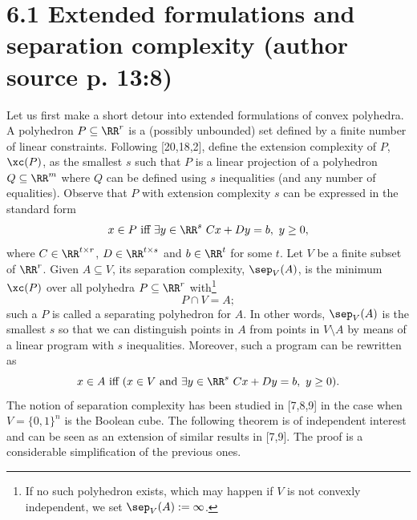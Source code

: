 \section*{6.1 Extended formulations and separation complexity (author source p. 13:8)}
Let us first make a short detour into extended formulations of convex polyhedra.
A polyhedron $P\subseteq\RR^r$ is a (possibly unbounded) set defined by a finite number of linear constraints. Following [20,18,2], define the extension complexity of $P$, $\xc(P)$, as the smallest $s$ such that $P$ is a linear projection of a polyhedron $Q\subseteq\RR^m$ where $Q$ can be defined using $s$ inequalities (and any number of equalities). Observe that $P$ with extension complexity $s$ can be expressed in the standard form
\[x\in P\text{ iff }\exists y\in\RR^s\ Cx+Dy=b,\ y\ge0,\]
where $C\in\RR^{t\times r}$, $D\in\RR^{t\times s}$ and $b\in\RR^t$ for some $t$.
Let $V$ be a finite subset of $\RR^r$. Given $A\subseteq V$, its separation complexity, $\sep_V(A)$, is the minimum $\xc(P)$ over all polyhedra $P\subseteq\RR^r$ with\footnote{If no such polyhedron exists, which may happen if $V$ is not convexly independent, we set $\sep_V(A):=\infty$.}
\[P\cap V=A;\]
such a $P$ is called a separating polyhedron for $A$. In other words, $\sep_V(A)$ is the smallest $s$ so that we can distinguish points in $A$ from points in $V\setminus A$ by means of a linear program with $s$ inequalities. Moreover, such a program can be rewritten as
\[x\in A\text{ iff }(x\in V\text{ and }\exists y\in\RR^s\ Cx+Dy=b,\ y\ge0).\]
The notion of separation complexity has been studied in [7,8,9] in the case when $V=\{0,1\}^n$ is the Boolean cube. The following theorem is of independent interest and can be seen as an extension of similar results in [7,9]. The proof is a considerable simplification of the previous ones.
